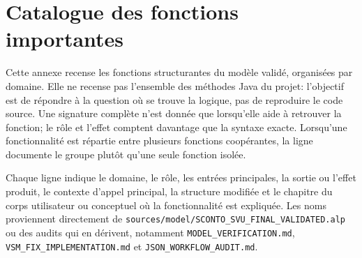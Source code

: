 \chapter{Catalogue des fonctions importantes}
\label{ann:fonctions}

Cette annexe recense les fonctions structurantes du modèle validé, organisées par domaine. Elle ne recense pas l'ensemble des méthodes Java du projet: l'objectif est de répondre à la question où se trouve la logique, pas de reproduire le code source. Une signature complète n'est donnée que lorsqu'elle aide à retrouver la fonction; le rôle et l'effet comptent davantage que la syntaxe exacte. Lorsqu'une fonctionnalité est répartie entre plusieurs fonctions coopérantes, la ligne documente le groupe plutôt qu'une seule fonction isolée.

Chaque ligne indique le domaine, le rôle, les entrées principales, la sortie ou l'effet produit, le contexte d'appel principal, la structure modifiée et le chapitre du corps utilisateur ou conceptuel où la fonctionnalité est expliquée. Les noms proviennent directement de \texttt{sources/model/SCONTO\_\allowbreak SVU\_\allowbreak FINAL\_\allowbreak VALIDATED.alp} ou des audits qui en dérivent, notamment \texttt{MODEL\_\allowbreak VERIFICATION.md}, \texttt{VSM\_\allowbreak FIX\_\allowbreak IMPLEMENTATION.md} et \texttt{JSON\_\allowbreak WORKFLOW\_\allowbreak AUDIT.md}.

